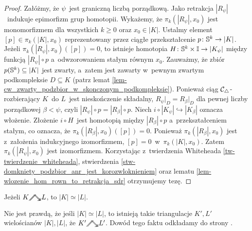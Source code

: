 \begin{proof}
Załóżmy, że $\psi$~jest graniczną liczbą porządkową. Jako retrakcja $\left|R_\psi\right|$~indukuje epimorfizm grup homotopii. Wykażemy, że $\pi_k\left(\left|R_\psi\right|,x_0\right)$ jest monomorfizmem dla wszystkich $k\geq 0$ oraz $x_0\in |K|$. Ustalmy element $[p]\in \pi_k(|K|,x_0)$ reprezentowany przez ciągłe przekształcenie $p\colon \S^k\to |K|$. Jeżeli $\pi_k\left(\left|R_\psi\right|,x_0\right)([p])=0$, to istnieje homotopia $H\colon \S^k\times \I\to |K_{\psi}|$ między funkcją $\left|R_\psi\right|\circ p$ a~odwzorowaniem stałym równym $x_0$.
Zauważmy, że zbiór $p(\S^k)\subseteq |K|$ jest zwarty, a~zatem jest zawarty w~pewnym zwartym podkompleksie $D\subseteq K$ (patrz lemat \ref{lem-cw_zwarty_podzbior_w_skonczonym_podkompleksie}). Ponieważ ciąg $\mCtriang$-rozbierający $K$~do $L$~jest nieskończenie składalny, $R_\psi\big|_D=R_\beta\big|_D$ dla pewnej liczby porządkowej $\beta<\psi$, czyli $\left|R_\psi\right|\circ p=\left|R_\beta\right|\circ p$. Niech $i\circ \left|K_\psi\right|\hookrightarrow \left|K_\beta\right|$ oznacza włożenie. Złożenie $i\circ H$~jest homotopią między $\left|R_\beta\right|\circ p$ a~przekształceniem stałym, co oznacza, że $\pi_k\left(\left|R_\beta\right|,x_0\right)([p])=0$. Ponieważ $\pi_k\left(\left|R_\beta\right|,x_0\right)$ jest z~założenia indukcyjnego izomorfizmem, $[p]=0$~w~$\pi_k(|K|,x_0)$. Zatem $\pi_k\left(\left|R_\psi\right|,x_0\right)$ jest izomorfizmem. Korzystając z~twierdzenia Whiteheada \ref{tw-twierdzenie_whiteheada}, stwierdzenia \ref{stw-domkniety_podzbior_anr_jest_korozwloknieniem} oraz lematu \ref{lem-wlozenie_hom_rown_to_retrakcja_sdr} otrzymujemy tezę.
\end{proof}
\begin{wn}
Jeżeli $K\stronghe L$, to $|K|\simeq |L|$.
\end{wn}

\begin{uw}\label{uw-he_nie_implikuje_stronghe}
Nie jest prawdą, że jeśli $|K|\simeq |L|$, to istnieją takie triangulacje $K',L'$ wielościanów $|K|,|L|$, że $K'\stronghe L'$. Dowód tego faktu odkładamy do strony \pageref{dowod-uw-he_nie_implikuje_stronghe}.
\end{uw}

